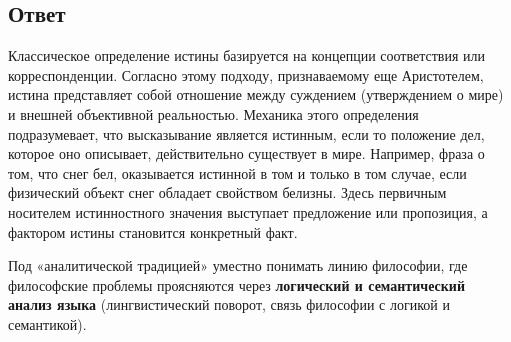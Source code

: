\documentclass[a4paper,12pt]{article}
\begin{document}
\subsection{Ответ}
Классическое определение истины базируется на концепции соответствия или корреспонденции. Согласно этому подходу, признаваемому еще Аристотелем, истина представляет собой отношение между суждением (утверждением о мире) и внешней объективной реальностью. Механика этого определения подразумевает, что высказывание является истинным, если то положение дел, которое оно описывает, действительно существует в мире. Например, фраза о том, что снег бел, оказывается истинной в том и только в том случае, если физический объект снег обладает свойством белизны. Здесь первичным носителем истинностного значения выступает предложение или пропозиция, а фактором истины становится конкретный факт.


Под «аналитической традицией» уместно понимать линию философии, где философские проблемы проясняются через \textbf{логический и семантический анализ языка} (лингвистический поворот, связь философии с логикой и семантикой).
\end{document}
